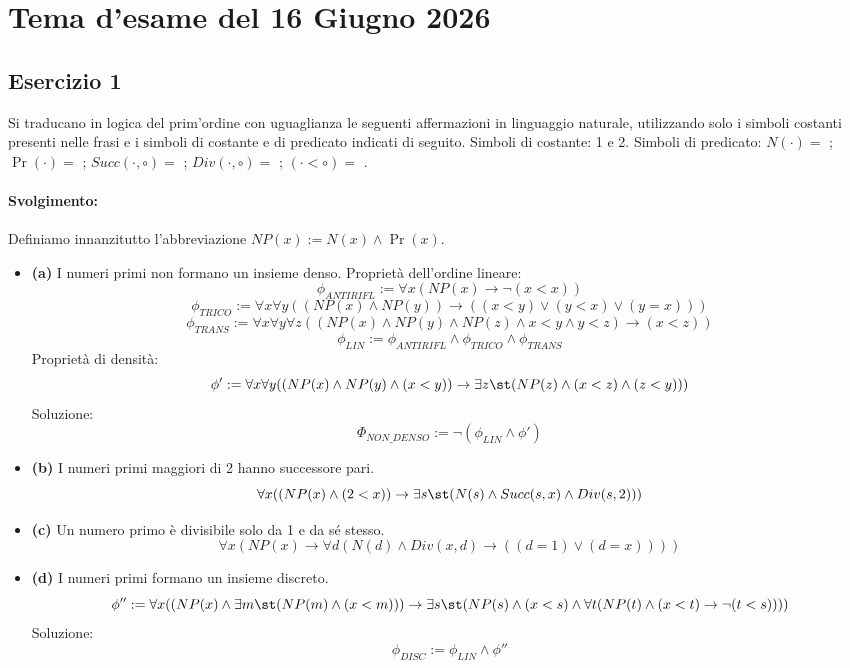 \section{Tema d'esame del 16 Giugno 2026}
\subsection*{Esercizio 1}
Si traducano in logica del prim'ordine con uguaglianza le seguenti affermazioni in linguaggio naturale, utilizzando solo i simboli costanti presenti nelle frasi e i simboli di costante e di predicato indicati di seguito. Simboli di costante: 1 e 2. Simboli di predicato: \(N(\cdot)=\) ; \(\Pr(\cdot)=\) ; \(Succ(\cdot,\circ)=\) ; \(Div(\cdot,\circ)=\) ; \((\cdot < \circ)=\) .
\paragraph{Svolgimento:}
Definiamo innanzitutto l'abbreviazione \(NP(x) := N(x) \land \Pr(x)\).

\begin{itemize}
    \item \textbf{(a)} I numeri primi non formano un insieme denso.
    Proprietà dell'ordine lineare:
    \[ \phi_{ANTIRIFL} := \forall x (NP(x) \to \neg(x < x)) \]
    \[ \phi_{TRICO} := \forall x \forall y ((NP(x) \land NP(y)) \to ((x < y) \lor (y < x) \lor (y = x))) \]
    \[ \phi_{TRANS} := \forall x \forall y \forall z ((NP(x) \land NP(y) \land NP(z) \land x < y \land y < z) \to (x < z)) \]
    \[ \phi_{LIN} := \phi_{ANTIRIFL} \land \phi_{TRICO} \land \phi_{TRANS} \]
    Proprietà di densità:
    \[ \phi' := \forall x \forall y ((NP(x) \land NP(y) \land (x < y)) \to \exists z \st (NP(z) \land (x < z) \land (z < y))) \]
    Soluzione:
    \[ \Phi_{NON\_DENSO} := \neg(\phi_{LIN} \land \phi') \]

    \item \textbf{(b)} I numeri primi maggiori di 2 hanno successore pari.
    \[ \forall x ((NP(x) \land (2 < x)) \to \exists s \st (N(s) \land Succ(s, x) \land Div(s, 2))) \]

    \item \textbf{(c)} Un numero primo è divisibile solo da 1 e da sé stesso.
    \[ \forall x (NP(x) \to \forall d (N(d) \land Div(x, d) \to ((d = 1) \lor (d = x)))) \]

    \item \textbf{(d)} I numeri primi formano un insieme discreto.
    \[ \phi'' := \forall x ((NP(x) \land \exists m \st (NP(m) \land (x < m))) \to \exists s \st (NP(s) \land (x < s) \land \forall t (NP(t) \land (x < t) \to \neg(t < s)))) \]
    Soluzione:
    \[ \phi_{DISC} := \phi_{LIN} \land \phi'' \]
\end{itemize}

